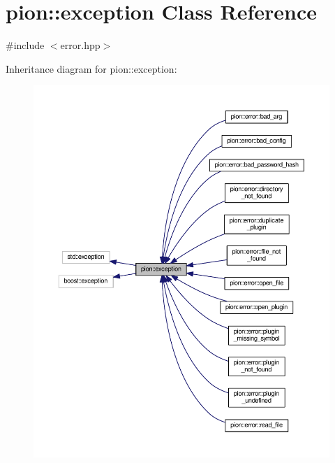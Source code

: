 \hypertarget{classpion_1_1exception}{\section{pion\-:\-:exception Class Reference}
\label{classpion_1_1exception}
}


{\ttfamily \#include $<$error.\-hpp$>$}



Inheritance diagram for pion\-:\-:exception\-:
\nopagebreak
\begin{figure}[H]
\begin{center}
\leavevmode
\includegraphics[width=350pt]{classpion_1_1exception__inherit__graph}
\end{center}
\end{figure}


